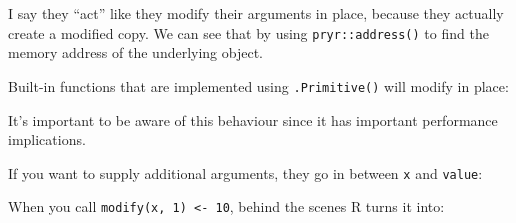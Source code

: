 I say they ``act'' like they modify their arguments in place, because
they actually create a modified copy. We can see that by using
\texttt{pryr::address()} to find the memory address of the underlying
object.

\begin{Shaded}
\begin{Highlighting}[]
\StringTok{ }\NormalTok{:}
\StringTok{ }
\end{Highlighting}
\end{Shaded}

Built-in functions that are implemented using \texttt{.Primitive()} will
modify in place: 

\begin{Shaded}
\begin{Highlighting}[]
\StringTok{ }\NormalTok{:}

\NormalTok{x[}\NormalTok{] <-}\StringTok{ }
\end{Highlighting}
\end{Shaded}

It's important to be aware of this behaviour since it has important
performance implications.

If you want to supply additional arguments, they go in between
\texttt{x} and \texttt{value}:

\begin{Shaded}
\begin{Highlighting}[]
 \NormalTok{<-}\StringTok{ }
  \StringTok{ }
\NormalTok{\}}
\NormalTok{) <-}\StringTok{ }
\end{Highlighting}
\end{Shaded}

When you call \texttt{modify(x, 1) \textless{}- 10}, behind the scenes R
turns it into:

